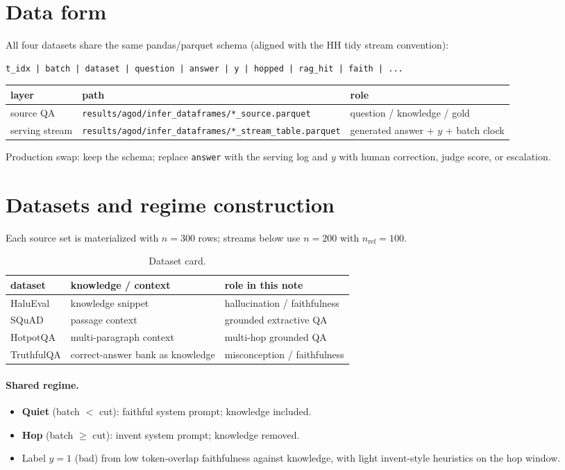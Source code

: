 \documentclass[11pt]{article}
\begin{document}
\section{Data form}
All four datasets share the same pandas/parquet schema
(aligned with the HH tidy stream convention):
\begin{verbatim}
t_idx | batch | dataset | question | answer | y | hopped | rag_hit | faith | ...
\end{verbatim}

\begin{center}\small
\begin{tabular}{lll}
\toprule
layer & path & role \\
\midrule
source QA & \texttt{results/agod/infer\_dataframes/*\_source.parquet}
  & question / knowledge / gold \\
serving stream & \texttt{results/agod/infer\_dataframes/*\_stream\_table.parquet}
  & generated answer + $y$ + batch clock \\
\bottomrule
\end{tabular}
\end{center}

\noindent
Production swap: keep the schema; replace \texttt{answer} with the serving log
and $y$ with human correction, judge score, or escalation.

\section{Datasets and regime construction}
Each source set is materialized with $n=300$ rows; streams below use $n=200$
with $n_{\mathrm{ref}}=100$.

\begin{table}[h]
\centering
\caption{Dataset card.}
\begin{tabular}{lll}
\toprule
dataset & knowledge / context & role in this note \\
\midrule
HaluEval & knowledge snippet & hallucination / faithfulness \\
SQuAD & passage context & grounded extractive QA \\
HotpotQA & multi-paragraph context & multi-hop grounded QA \\
TruthfulQA & correct-answer bank as knowledge & misconception / faithfulness \\
\bottomrule
\end{tabular}
\end{table}

\paragraph{Shared regime.}
\begin{itemize}[leftmargin=1.2em]
\item \textbf{Quiet} (batch $<$ cut): faithful system prompt; knowledge included.
\item \textbf{Hop} (batch $\ge$ cut): invent system prompt; knowledge removed.
\item Label $y=1$ (bad) from low token-overlap faithfulness against knowledge,
with light invent-style heuristics on the hop window.
\end{itemize}
\end{document}
